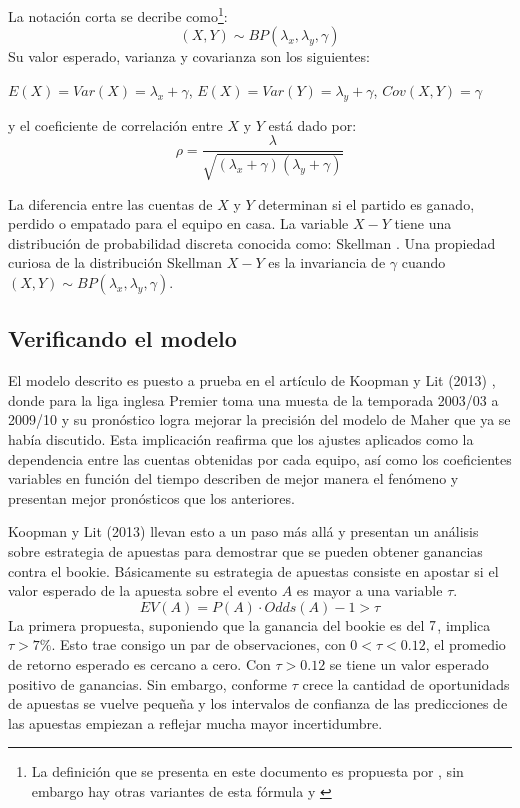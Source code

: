 La notación corta se decribe como\footnote{La definición que se presenta en este documento es propuesta por \cite{koopman2013dynamic}, sin embargo hay otras variantes de esta fórmula \cite{kocherlakota1992bivariate} y \cite{johnson1997discrete}}:
\[(X,Y) \sim BP(\lambda_x,\lambda_y,\gamma)\]
Su valor esperado, varianza y covarianza son los siguientes:


$E(X) = Var(X) = \lambda_x + \gamma$, $E(X) = Var(Y) = \lambda_y + \gamma$, $Cov(X,Y) = \gamma$


y el coeficiente de correlación entre $X$ y $Y$ está dado por:
\[\rho = \frac{\lambda}{\sqrt{(\lambda_x+\gamma)(\lambda_y+\gamma)}}\]

La diferencia entre las cuentas de $X$ y $Y$ determinan si el partido es ganado, perdido o empatado para el equipo en casa. La variable $X-Y$ tiene una distribución de probabilidad discreta conocida como: Skellman \cite{skellam1946frequency}. Una propiedad curiosa de la distribución Skellman $X-Y$ es la invariancia de $\gamma$ cuando $(X,Y) \sim BP(\lambda_x,\lambda_y,\gamma)$.

\subsection{Verificando el modelo}
\label{subsec:verification}

El modelo descrito es puesto a prueba en el artículo de Koopman y Lit (2013) \cite{koopman2013dynamic}, donde para la liga inglesa Premier toma una muesta de la temporada 2003/03 a 2009/10 y su pronóstico logra mejorar la precisión del modelo de Maher \cite{maher1982modelling} que ya se había discutido. Esta implicación reafirma que los ajustes aplicados como la dependencia entre las cuentas obtenidas por cada equipo, así como los coeficientes variables en función del tiempo describen de mejor manera el fenómeno y presentan mejor pronósticos que los anteriores.

Koopman y Lit (2013) \cite{koopman2013dynamic} llevan esto a un paso más allá y presentan un análisis sobre estrategia de apuestas para demostrar que se pueden obtener ganancias contra el bookie. Básicamente su estrategia de apuestas consiste en apostar si el valor esperado de la apuesta sobre el evento $A$ es mayor a una variable $\tau$.
\[EV(A) = P(A) \cdot Odds(A) - 1 > \tau\]
La primera propuesta, suponiendo que la ganancia del bookie es del $7\/$, implica $\tau > 7\%$. Esto trae consigo un par de observaciones, con $0<\tau<0.12$, el promedio de retorno esperado es cercano a cero. Con $\tau>0.12$ se tiene un valor esperado positivo de ganancias. Sin embargo, conforme $\tau$ crece  la cantidad de oportunidads de apuestas se vuelve pequeña y los intervalos de confianza de las predicciones de las apuestas empiezan a reflejar mucha mayor incertidumbre.

